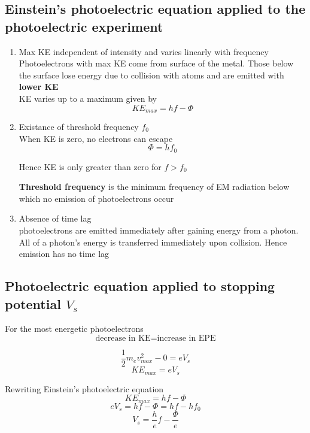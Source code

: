 \documentclass[a4paper, 10pt]{article}
\begin{document}
\subsection{Einstein's photoelectric equation applied to the photoelectric experiment}
\begin{enumerate}
   \item Max KE independent of intensity and varies linearly with frequency \\

      Photoelectrons with max KE come from surface of the metal. Those below the surface lose energy due to collision with atoms and are emitted with \textbf{lower KE} \\

      KE varies up to a maximum given by
      \[
         KE_{max} = hf - \Phi
      \]
   \item Existance of threshold frequency $f_0$ \\

     When KE is zero, no electrons can escape
     \[
     \Phi = hf_0
     \]

     Hence KE is only greater than zero for $f > f_0$ 

     \begin{framed}
        \textbf{Threshold frequency} is the minimum frequency of EM radiation below which no emission of photoelectrons occur
     \end{framed}	

  \item Absence of time lag \\

     photoelectrons are emitted immediately after gaining energy from a photon. All of a photon's energy is transferred immediately upon collision. Hence emission has no time lag
      
\end{enumerate}	

\subsection{Photoelectric equation applied to stopping potential $V_s$}

For the most energetic photoelectrons
\[
   \text{decrease in KE} = \text{increase in EPE}
\]

\[
   \frac{1}{2}m_e v_{max}^2 - 0 = eV_s
\]
\[
   KE_{max} = eV_s
\]

Rewriting Einstein's photoelectric equation
\[
   KE_{max} = hf - \Phi
\]
\[
eV_s = hf - \Phi = hf - hf_0
\]
\[
   V_s = \frac{h}{e}f - \frac{\Phi}{e}
\]
\end{document}
